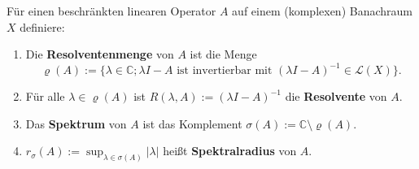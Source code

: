 \begin{defi} Für einen beschränkten linearen Operator $A$ auf einem (komplexen) Banachraum $X$ definiere:
\begin{enumerate}
\item Die \textbf{Resolventenmenge}  von $A$ ist die Menge
\begin{equation*}
    \varrho(A):=\{\lambda \in\mathbb C; \lambda I-A \text{ ist invertierbar mit }(\lambda I-A)^{-1}\in \mathcal L(X)\}.
\end{equation*}
\item  Für alle $\lambda\in\varrho(A)$  ist $R(\lambda, A):=(\lambda I-A)^{-1}$ die \textbf{Resolvente}  von $A$. 
\item Das \textbf{Spektrum} von $A$ ist das Komplement $\sigma(A):=\mathbb C\setminus \varrho(A)$.
\item $r_\sigma (A):=\sup_{\lambda\in \sigma(A)} |\lambda |$ heißt \textbf{Spektralradius} von $A$.
\end{enumerate}
\end{defi}



